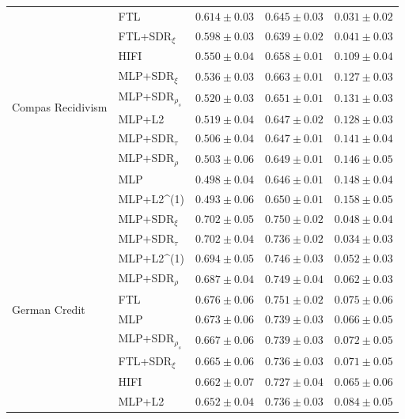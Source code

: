\begin{tabular}{lllll}
\cline{1-5}
\multirow[t]{10}{*}{Compas Recidivism} & FTL & $0.614 \pm0.03$ & $0.645 \pm0.03$ & $0.031 \pm0.02$ \\
 & FTL+SDR$_{\xi}$ & $0.598 \pm0.03$ & $0.639 \pm0.02$ & $0.041 \pm0.03$ \\
 & HIFI & $0.550 \pm0.04$ & $0.658 \pm0.01$ & $0.109 \pm0.04$ \\
 & MLP+SDR$_{\xi}$ & $0.536 \pm0.03$ & $0.663 \pm0.01$ & $0.127 \pm0.03$ \\
 & MLP+SDR$_{\rho_s}$ & $0.520 \pm0.03$ & $0.651 \pm0.01$ & $0.131 \pm0.03$ \\
 & MLP+L2 & $0.519 \pm0.04$ & $0.647 \pm0.02$ & $0.128 \pm0.03$ \\
 & MLP+SDR$_{\tau}$ & $0.506 \pm0.04$ & $0.647 \pm0.01$ & $0.141 \pm0.04$ \\
 & MLP+SDR$_{\rho}$ & $0.503 \pm0.06$ & $0.649 \pm0.01$ & $0.146 \pm0.05$ \\
 & MLP & $0.498 \pm0.04$ & $0.646 \pm0.01$ & $0.148 \pm0.04$ \\
 & MLP+L2^{(1)} & $0.493 \pm0.06$ & $0.650 \pm0.01$ & $0.158 \pm0.05$ \\
\cline{1-5}
\multirow[t]{10}{*}{German Credit} & MLP+SDR$_{\xi}$ & $0.702 \pm0.05$ & $0.750 \pm0.02$ & $0.048 \pm0.04$ \\
 & MLP+SDR$_{\tau}$ & $0.702 \pm0.04$ & $0.736 \pm0.02$ & $0.034 \pm0.03$ \\
 & MLP+L2^{(1)} & $0.694 \pm0.05$ & $0.746 \pm0.03$ & $0.052 \pm0.03$ \\
 & MLP+SDR$_{\rho}$ & $0.687 \pm0.04$ & $0.749 \pm0.04$ & $0.062 \pm0.03$ \\
 & FTL & $0.676 \pm0.06$ & $0.751 \pm0.02$ & $0.075 \pm0.06$ \\
 & MLP & $0.673 \pm0.06$ & $0.739 \pm0.03$ & $0.066 \pm0.05$ \\
 & MLP+SDR$_{\rho_s}$ & $0.667 \pm0.06$ & $0.739 \pm0.03$ & $0.072 \pm0.05$ \\
 & FTL+SDR$_{\xi}$ & $0.665 \pm0.06$ & $0.736 \pm0.03$ & $0.071 \pm0.05$ \\
 & HIFI & $0.662 \pm0.07$ & $0.727 \pm0.04$ & $0.065 \pm0.06$ \\
 & MLP+L2 & $0.652 \pm0.04$ & $0.736 \pm0.03$ & $0.084 \pm0.05$ \\
\cline{1-5}
\bottomrule
\end{tabular}
